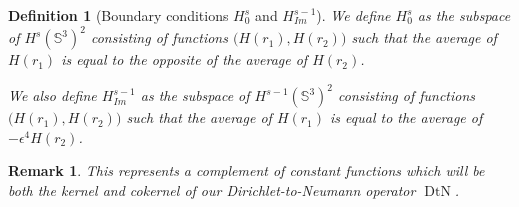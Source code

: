 \documentclass[12pt]{article}
\newtheorem{defn}[thm]{Definition}
\newtheorem{rem}[thm]{Remark}
\begin{document}
    \begin{defn}[Boundary conditions $ H^s_{0} $ and $H^{s-1}_{Im}$]
        We define $ H^s_{0} $ as the subspace of $H^s(\mathbb{S}^3)^2$ consisting of functions $\big(H(r_1),H(r_2)\big)$ such that the average of $H(r_1)$ is equal to the opposite of the average of $H(r_2)$. 
        
        We also define $H^{s-1}_{Im}$ as the subspace of $H^{s-1}(\mathbb{S}^3)^2$ consisting of functions $\big(H(r_1),H(r_2)\big)$ such that the average of $H(r_1)$ is equal to the average of $-\epsilon^4H(r_2)$. 
    \end{defn}
    \begin{rem}
        This represents a complement of constant functions which will be both the kernel and cokernel of our Dirichlet-to-Neumann operator $\operatorname{DtN}$.
    \end{rem}
    
\end{document}
